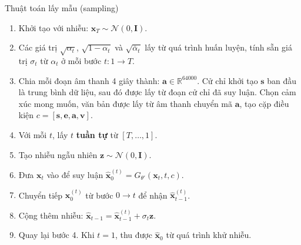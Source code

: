 \begin{algorithm}
	\caption{Thuật toán lấy mẫu (sampling)}
	\setlength{\baselineskip}{10pt}
	\begin{enumerate}
		\item Khởi tạo với nhiễu: $\mathbf{x}_T \sim \mathcal{N}(0, \mathbf{I})$.
		
		\item Các giá trị $\sqrt{\alpha_t}$, $\sqrt{1 - \alpha_t}$ và $\sqrt{\bar{\alpha}_t}$ lấy từ quá trình huấn luyện, tính sẵn giá trị $\sigma_t$ từ $\alpha_t$ ở mỗi bước $t: 1 \rightarrow T$.
		
		\item Chia mỗi đoạn âm thanh 4 giây thành: $\mathbf{a} \in \mathbb{R}^{64000}$. Cử chỉ khởi tạo $\mathbf{s}$ ban đầu là trung bình dữ liệu, sau đó được lấy từ đoạn cử chỉ đã suy luận. Chọn cảm xúc mong muốn, văn bản được lấy từ âm thanh chuyển mã $\mathbf{a}$, tạo cặp điều kiện $c = [\mathbf{s}, \mathbf{e}, \mathbf{a}, \mathbf{v}]$.
		
		\item Với mỗi $t$, lấy $t$ \textbf{tuần tự} từ $[T, \dots, 1]$.
		
		\item Tạo nhiễu ngẫu nhiên $\mathbf{z} \sim \mathcal{N}(0, \mathbf{I})$.
		
		\item Đưa $\mathbf{x}_t$ vào để suy luận $\hat{\mathbf{x}}_0^{(t)} = G_{\theta'}(\mathbf{x}_t, t, c)$.
		
		\item Chuyển tiếp $\hat{\mathbf{x}}_0^{(t)}$ từ bước $0 \rightarrow t$ để nhận $\hat{\mathbf{x}}_{t-1}^{(t)}$.
		
		\item Cộng thêm nhiễu: $\hat{\mathbf{x}}_{t-1} = \hat{\mathbf{x}}_{t-1}^{(t)} + \sigma_t \mathbf{z}$.
		
		\item Quay lại bước 4. Khi $t = 1$, thu được $\hat{\mathbf{x}}_0$ từ quá trình khử nhiễu.
	\end{enumerate}
	\label{alg:sampling}
\end{algorithm}

